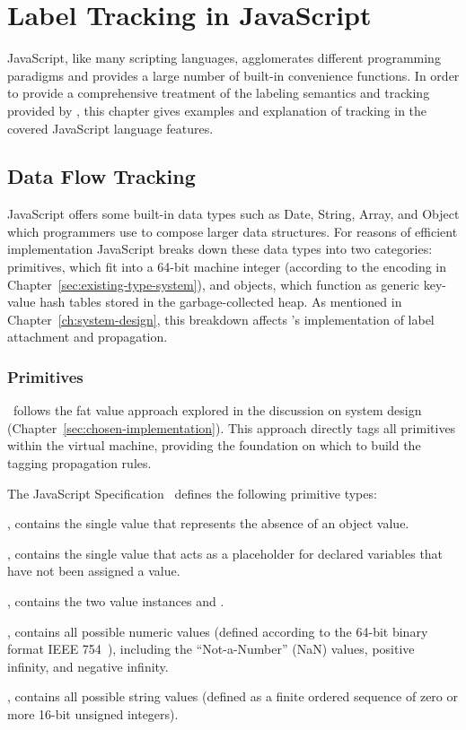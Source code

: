 
\chapter{Label Tracking in JavaScript}
\label{ch:label-tracking}

JavaScript, like many scripting languages, agglomerates different programming paradigms and provides a large number of built-in convenience functions.
In order to provide a comprehensive treatment of the labeling semantics and tracking provided by \FlowCore, this chapter gives examples and explanation of tracking in the covered JavaScript language features.

\section{Data Flow Tracking}
\label{sec:data-flow-tracking}

JavaScript offers some built-in data types such as Date, String, Array, and Object which programmers use to compose larger data structures.
For reasons of efficient implementation JavaScript breaks down these data types into two categories: primitives, which fit into a 64-bit machine integer (according to the encoding in Chapter~\ref{sec:existing-type-system}), and objects, which function as generic key-value hash tables stored in the garbage-collected heap.
As mentioned in Chapter~\ref{ch:system-design}, this breakdown affects \FlowCore's implementation of label attachment and propagation.

\subsection{Primitives}

\FlowCore\ follows the fat value approach explored in the discussion on system design (Chapter~\ref{sec:chosen-implementation}).
This approach directly tags all primitives within the virtual machine, providing the foundation on which to build the tagging propagation rules.

The JavaScript Specification~\cite{ecma} defines the following primitive types:
\begin{description}
  \item \textbf{}, contains the single value  that represents the absence of an object value.
  \item \textbf{}, contains the single value  that acts as a placeholder for declared variables that have not been assigned a value.
  \item \textbf{}, contains the two value instances  and .
  \item \textbf{}, contains all possible numeric values (defined according to the 64-bit binary format IEEE 754~\cite{ieee754}), including the ``Not-a-Number'' (NaN) values, positive infinity, and negative infinity.
  \item \textbf{}, contains all possible string values (defined as a finite ordered sequence of zero or more 16-bit unsigned integers).
\end{description}

